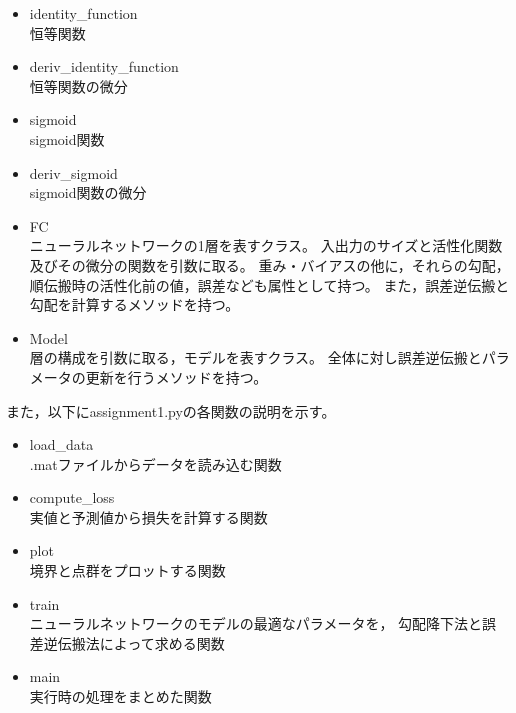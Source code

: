 \documentclass[class=jsarticle, crop=false, dvipdfmx, fleqn]{standalone}
\begin{document}
\begin{itemize}
    \item identity\_function \\
        恒等関数
    \item deriv\_identity\_function \\
        恒等関数の微分
    \item sigmoid \\
        sigmoid関数
    \item deriv\_sigmoid \\
        sigmoid関数の微分
    \item FC \\
        ニューラルネットワークの1層を表すクラス。
        入出力のサイズと活性化関数及びその微分の関数を引数に取る。
        重み・バイアスの他に，それらの勾配，順伝搬時の活性化前の値，誤差なども属性として持つ。
        また，誤差逆伝搬と勾配を計算するメソッドを持つ。
    \item Model \\
        層の構成を引数に取る，モデルを表すクラス。
        全体に対し誤差逆伝搬とパラメータの更新を行うメソッドを持つ。
\end{itemize}

また，以下にassignment1.pyの各関数の説明を示す。

\begin{itemize}
    \item load\_data \\
        .matファイルからデータを読み込む関数
    \item compute\_loss \\
        実値と予測値から損失を計算する関数
    \item plot \\
        境界と点群をプロットする関数
    \item train \\
        ニューラルネットワークのモデルの最適なパラメータを，
        勾配降下法と誤差逆伝搬法によって求める関数
    \item main \\
        実行時の処理をまとめた関数
\end{itemize}
\end{document}
